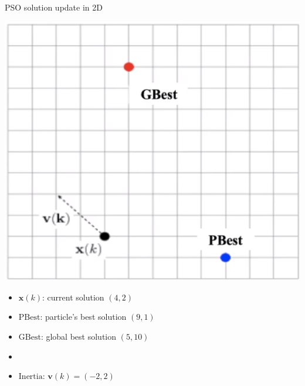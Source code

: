 \documentclass[pdflatex,compress,mathserif]{beamer}
\begin{document}
\begin{frame}{PSO solution update in 2D}
	\begin{multicols}{2}
		\includegraphics[width=\linewidth]{img/11}
		\vfill\null
		\columnbreak
		\begin{itemize}
			\item[] \scriptsize{$\mathbf{x}(k)$: current solution $(4,2)$}
			\item[] \scriptsize{$\text{PBest}$: particle's best solution $(9,1)$}
			\item[] \scriptsize{$\text{GBest}$: global best solution $(5,10)$}
			\item[] 
			\item[] \scriptsize{$\text{Inertia}$: $\mathbf{v}(k) = (-2,2)$}
		\end{itemize}
		\vfill\null
	\end{multicols}
\end{frame}
\end{document}
